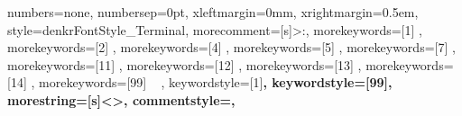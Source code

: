 {%
	numbers=none,%
	numbersep=0pt,%
	xleftmargin=0mm,%
	xrightmargin=0.5em,%
	style=denkrFontStyle_Terminal,%
	morecomment=[s]{>}{:},%
	morekeywords=[1]{%
	},%
	morekeywords=[2]{%
	},%
	morekeywords=[4]{%
	},%
	morekeywords=[5]{%
	},%
	morekeywords=[7]{%
	},%
	morekeywords=[11]{%
	},%
	morekeywords=[12]{%
	},%
	morekeywords=[13]{%
	},%
	morekeywords=[14]{%
	},%
	morekeywords=[99]{%
		~
	},%
	keywordstyle=[1]\color{lstCol_C_purple}\bfseries,%
	keywordstyle=[99]\color{lstCol_Terminal_signs},%
	morestring=[s]{<}{>},%
	commentstyle=\color{lstCol_Terminal_user}\bfseries,%
}%
%
%
%
%
%
\makeatletter
\newdimen\DenKrLst@baselength\setlength{\DenKrLst@baselength}{0.44em}%
\newdimen\DenKrLst@boxlength%
%
\def\DenKrLst@EscapeChar#1{%
	\expandafter\detokenize\expandafter{#1}%
}%
\def\DenKrLst@SplitChar#1#2{%
    \StrSplit{#2}{#1}\tempa\tempb%
	\DenKrLst@EscapeChar{\tempa}%
    \let\tempa\empty%
    \unless\ifx\tempb\empty\def\tempa{\hss\DenKrLst@SplitChar{#1}{\tempb}}\fi%
    \tempa%
}%
%
\newcommand{\DenKrLst@textstretched}[1]{%
	\StrLen{#1}[\tmpval]%
	\setlength{\DenKrLst@boxlength}{\tmpval\DenKrLst@baselength}%
	\hbox to \DenKrLst@boxlength{\hss\DenKrLst@SplitChar{1}{#1}\hss}%
}%
%
\newcommand{\DenKrLstBreakoutText}[1]{%
	\DenKrLst@textstretched{#1}%
}
\makeatother%
